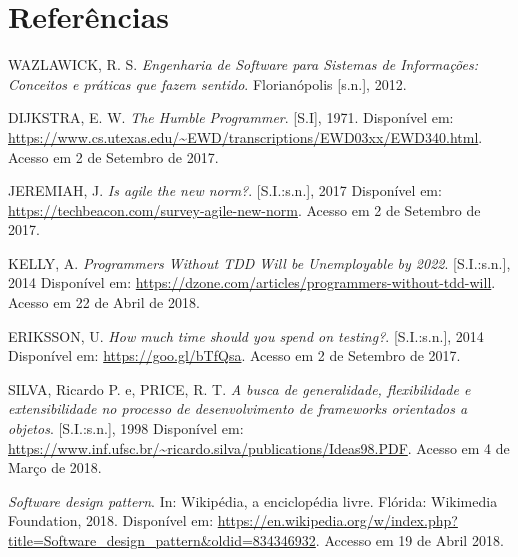 \documentclass[
    12pt,       %
    openright,      %
    twoside,      %
    a4paper,      %
    english,      %
    french,       %
    spanish,      %
    brazil,       %
    ]{abntex2}
\begin{document}



  \postextual


  
  \chapter*{Referências}
  \noindent
  WAZLAWICK, R. S. \textit{Engenharia de Software para Sistemas de Informações: Conceitos e práticas que fazem sentido}. Florianópolis [s.n.], 2012.

  \noindent
  DIJKSTRA, E. W. \textit{The Humble Programmer}. [S.I], 1971. Disponível em:
  \url{https://www.cs.utexas.edu/~EWD/transcriptions/EWD03xx/EWD340.html}.
  Acesso em 2 de Setembro de 2017.

  \noindent
  JEREMIAH, J. \textit{Is agile the new norm?}. [S.I.:s.n.], 2017 Disponível em:
  \url{https://techbeacon.com/survey-agile-new-norm}. Acesso em 2 de Setembro de 2017.

  \noindent
  KELLY, A. \textit{Programmers Without TDD Will be Unemployable by 2022}. [S.I.:s.n.],
  2014 Disponível em: \url{https://dzone.com/articles/programmers-without-tdd-will}. Acesso em 22 de Abril de 2018.

  \noindent
  ERIKSSON, U. \textit{How much time should you spend on testing?}. [S.I.:s.n.], 2014 Disponível em:
  \url{https://goo.gl/bTfQsa}. Acesso em 2 de Setembro de 2017.

  \noindent
  SILVA, Ricardo P. e, PRICE, R. T. \textit{A busca de generalidade, flexibilidade e extensibilidade no processo de desenvolvimento de frameworks orientados a objetos}. [S.I.:s.n.], 1998 Disponível em: \url{https://www.inf.ufsc.br/~ricardo.silva/publications/Ideas98.PDF}. Acesso em 4 de Março de 2018.

  \noindent
  \textit{Software design pattern}. In: Wikipédia, a enciclopédia livre. Flórida: Wikimedia Foundation,
  2018. Disponível em:
  \url{https://en.wikipedia.org/w/index.php?title=Software_design_pattern&oldid=834346932}. Accesso
  em 19 de Abril 2018.
\end{document}
